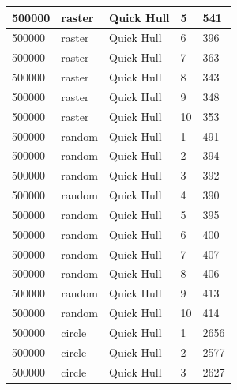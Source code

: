 \documentclass[12pt]{article}
\begin{document}
\begin{longtable}{|l|l|l|l|l|}
500000       & raster            & Quick Hull & 5          & 541                           \\ \hline
500000       & raster            & Quick Hull & 6          & 396                           \\ \hline
500000       & raster            & Quick Hull & 7          & 363                           \\ \hline
500000       & raster            & Quick Hull & 8          & 343                           \\ \hline
500000       & raster            & Quick Hull & 9          & 348                           \\ \hline
500000       & raster            & Quick Hull & 10         & 353                           \\ \hline
500000       & random            & Quick Hull & 1          & 491                           \\ \hline
500000       & random            & Quick Hull & 2          & 394                           \\ \hline
500000       & random            & Quick Hull & 3          & 392                           \\ \hline
500000       & random            & Quick Hull & 4          & 390                           \\ \hline
500000       & random            & Quick Hull & 5          & 395                           \\ \hline
500000       & random            & Quick Hull & 6          & 400                           \\ \hline
500000       & random            & Quick Hull & 7          & 407                           \\ \hline
500000       & random            & Quick Hull & 8          & 406                           \\ \hline
500000       & random            & Quick Hull & 9          & 413                           \\ \hline
500000       & random            & Quick Hull & 10         & 414                           \\ \hline
500000       & circle            & Quick Hull & 1          & 2656                          \\ \hline
500000       & circle            & Quick Hull & 2          & 2577                          \\ \hline
500000       & circle            & Quick Hull & 3          & 2627                          \\ \hline

\end{longtable}
\end{document}
